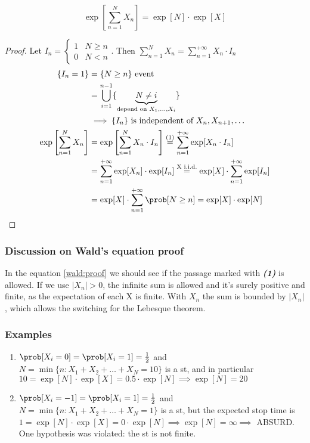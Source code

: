 \begin{equation}
  \exp\left[\sum\limits_{n=1}^N X_n \right] = \exp[N] \cdot \exp[X]
\end{equation}
\begin{proof}
  Let $I_n = \begin{cases} 1 & N \ge n \\ 0 & N<n \end{cases}$. Then $\sum\limits_{n=1}^N X_n = \sum\limits_{n=1}^{+\infty} X_n \cdot I_n$
\begin{equation}\begin{split}
  \{I_n=1\} &= \{N \ge n \} \text{ event}\\
  &= \bigcup\limits_{i=1}^{n-1}\{\underbrace{N \neq i}_{\text{depend on } X_1, \dots, X_i} \} \\
  &\implies \{I_n\} \text{ is independent of }X_n, X_{n+1}, \dots\\
  \exp\left[\sum\limits_{n=1}^{N}X_n\right] &= \exp\left[\sum\limits_{n=1}^{N}X_n \cdot I_n \right] \stackrel{(1)}{=} \sum\limits_{n=1}^{+\infty}\exp[X_n \cdot I_n] \\
  &=\sum\limits_{n=1}^{+\infty}\exp[X_n] \cdot \exp[I_n] \stackrel{\text{X i.i.d.}}{=} \exp[X]\cdot\sum\limits_{n=1}^{+\infty}\exp[I_n] \\
  &= \exp[X] \cdot \sum\limits_{n=1}^{+\infty}\prob[N \ge n] = \exp[X] \cdot \exp[N]
\end{split}\label{wald:proof}\end{equation}
\end{proof}
\subsubsection{Discussion on Wald's equation proof}
In the equation \ref{wald:proof} we should see if the passage marked with \textit{\textbf{(1)}} is allowed.
If we use $|X_n|>0$, the infinite sum is allowed and it's surely positive and finite, as the expectation of each X is finite.
With $X_n$ the sum is bounded by $|X_n|$, which allows the switching for the Lebesque theorem.
\subsubsection{Examples}

\begin{enumerate}
  \item $\prob[X_i=0]=\prob[X_i = 1] = \frac{1}{2}$ and $N = \min\{n : X_1 + X_2 + \dots + X_N =10\}$ is a \gls{st}, and in particular
  $10 = \exp[N] \cdot \exp[X] = 0.5 \cdot \exp[N] \implies \exp[N]=20$
  \item $\prob[X_i=-1]=\prob[X_i = 1] = \frac{1}{2}$ and $N = \min\{n : X_1 + X_2 + \dots + X_N =1\}$ is a \gls{st}, but the expected stop time
  is $1 = \exp[N] \cdot \exp[X] = 0 \cdot \exp[N] \implies \exp[N]=\infty \implies$ ABSURD. One hypothesis was violated: the \gls{st} is not finite.
\end{enumerate}
